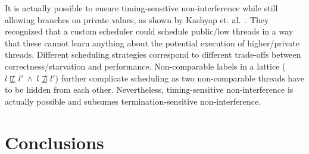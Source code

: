 \documentclass[10pt,preprint]{sigplanconf}
\begin{document}
It is actually possible to ensure timing-sensitive non-interference while still allowing branches on private values, as shown by Kashyap et. al.~\cite{kashyap2011}.  They recognized that a custom scheduler could schedule public/low threads in a way that these cannot learn anything about the potential execution of higher/private threads.  Different scheduling strategies correspond to different trade-offs between correctness/starvation and performance.  Non-comparable labels in a lattice ($l \not \sqsubseteq l'~\wedge~l \not \sqsupseteq l'$) further complicate scheduling as two non-comparable threads have to be hidden from each other.  Nevertheless, timing-sensitive non-interference is actually possible and subsumes termination-sensitive non-interference.




\section{Conclusions}




\end{document}
